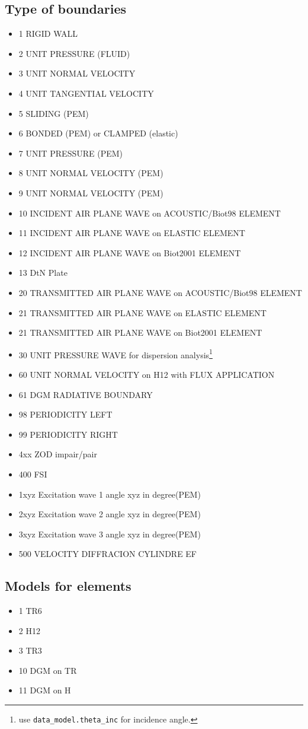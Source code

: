 \documentclass[11pt,A4paper]{book}
\renewcommand{\:}{\tb{:}}
\begin{document}
\subsection{Type of boundaries}
\begin{itemize}
\item 1 RIGID WALL
\item 2 UNIT PRESSURE (FLUID)
\item 3 UNIT NORMAL VELOCITY
\item 4 UNIT TANGENTIAL VELOCITY
\item 5 SLIDING (PEM)
\item 6 BONDED (PEM) or CLAMPED (elastic)
\item 7 UNIT PRESSURE (PEM)
\item 8 UNIT NORMAL VELOCITY (PEM)
\item 9 UNIT NORMAL VELOCITY (PEM)
\item 10 INCIDENT AIR PLANE WAVE on  ACOUSTIC/Biot98  ELEMENT 
\item 11 INCIDENT AIR PLANE WAVE on ELASTIC ELEMENT 
\item 12 INCIDENT AIR PLANE WAVE on Biot2001 ELEMENT
\item 13 DtN Plate
\item 20 TRANSMITTED AIR PLANE WAVE on  ACOUSTIC/Biot98  ELEMENT 
\item 21 TRANSMITTED AIR PLANE WAVE on ELASTIC ELEMENT 
\item 21 TRANSMITTED AIR PLANE WAVE on Biot2001 ELEMENT
\item 30 UNIT PRESSURE WAVE for dispersion analysis\footnote{use \texttt{data\_model.theta\_inc} for incidence angle.}
\item 60 UNIT NORMAL VELOCITY on H12 with FLUX APPLICATION
\item 61 DGM RADIATIVE BOUNDARY
\item 98 PERIODICITY LEFT
\item 99 PERIODICITY RIGHT
\item 4xx ZOD impair/pair
\item 400 FSI
\item 1xyz Excitation wave 1 angle xyz in degree(PEM)
\item 2xyz Excitation wave 2 angle xyz in degree(PEM)
\item 3xyz Excitation wave 3 angle xyz in degree(PEM)
\item 500 VELOCITY DIFFRACION CYLINDRE EF
\end{itemize}


\subsection{Models for elements}
\begin{itemize}
\item 1 TR6
\item 2 H12
\item 3 TR3
\item 10 DGM on TR
\item 11 DGM on H
\end{itemize}
\end{document}
